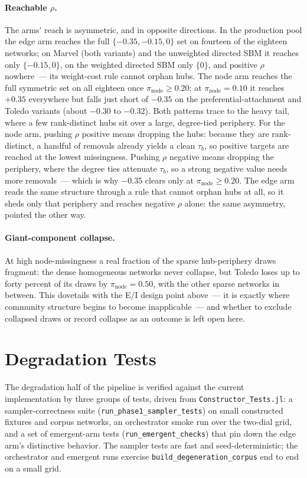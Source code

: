 \documentclass[11pt]{article}
\newcommand{\pinode}{\pi_{\text{node}}}
\begin{document}
\paragraph{Reachable $\rho$.} The arms' reach is asymmetric, and in opposite directions. In the production pool the edge arm reaches the full $\{-0.35, -0.15, 0\}$ set on fourteen of the eighteen networks; on Marvel (both variants) and the unweighted directed SBM it reaches only $\{-0.15, 0\}$, on the weighted directed SBM only $\{0\}$, and positive $\rho$ nowhere~--- its weight-cost rule cannot orphan hubs. The node arm reaches the full symmetric set on all eighteen once $\pinode \geq 0.20$; at $\pinode = 0.10$ it reaches $+0.35$ everywhere but falls just short of $-0.35$ on the preferential-attachment and Toledo variants (about $-0.30$ to $-0.32$). Both patterns trace to the heavy tail, where a few rank-distinct hubs sit over a large, degree-tied periphery. For the node arm, pushing $\rho$ positive means dropping the hubs: because they are rank-distinct, a handful of removals already yields a clean $\tau_b$, so positive targets are reached at the lowest missingness. Pushing $\rho$ negative means dropping the periphery, where the degree ties attenuate $\tau_b$, so a strong negative value needs more removals~--- which is why $-0.35$ clears only at $\pinode \geq 0.20$. The edge arm reads the same structure through a rule that cannot orphan hubs at all, so it sheds only that periphery and reaches negative $\rho$ alone: the same asymmetry, pointed the other way.

\paragraph{Giant-component collapse.} At high node-missingness a real fraction of the sparse hub-periphery draws fragment: the dense homogeneous networks never collapse, but Toledo loses up to forty percent of its draws by $\pinode = 0.50$, with the other sparse networks in between. This dovetails with the E/I design point above~--- it is exactly where community structure begins to become inapplicable~--- and whether to exclude collapsed draws or record collapse as an outcome is left open here.

\section{Degradation Tests}

The degradation half of the pipeline is verified against the current implementation by three groups of tests, driven from \texttt{Constructor\_Tests.jl}: a sampler-correctness suite (\texttt{run\_phase1\_sampler\_tests}) on small constructed fixtures and corpus networks, an orchestrator smoke run over the two-dial grid, and a set of emergent-arm tests (\texttt{run\_emergent\_checks}) that pin down the edge arm's distinctive behavior. The sampler tests are fast and seed-deterministic; the orchestrator and emergent runs exercise \texttt{build\_degeneration\_corpus} end to end on a small grid.
\end{document}
